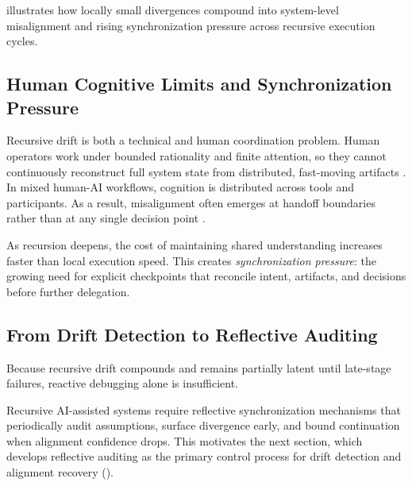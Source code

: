  illustrates how locally small divergences compound into system-level misalignment and rising synchronization pressure across recursive execution cycles.

\subsection{Human Cognitive Limits and Synchronization Pressure}

Recursive drift is both a technical and human coordination problem. Human operators work under bounded rationality and finite attention, so they cannot continuously reconstruct full system state from distributed, fast-moving artifacts \cite{Simon1957ModelsMan,Sweller1988CognitiveLoad}. In mixed human-AI workflows, cognition is distributed across tools and participants. As a result, misalignment often emerges at handoff boundaries rather than at any single decision point \cite{Hutchins1995CognitionWild}.

As recursion deepens, the cost of maintaining shared understanding increases faster than local execution speed. This creates \textit{synchronization pressure}: the growing need for explicit checkpoints that reconcile intent, artifacts, and decisions before further delegation.

\subsection{From Drift Detection to Reflective Auditing}

Because recursive drift compounds and remains partially latent until late-stage failures, reactive debugging alone is insufficient.

Recursive AI-assisted systems require reflective synchronization mechanisms that periodically audit assumptions, surface divergence early, and bound continuation when alignment confidence drops. This motivates the next section, which develops reflective auditing as the primary control process for drift detection and alignment recovery ().
